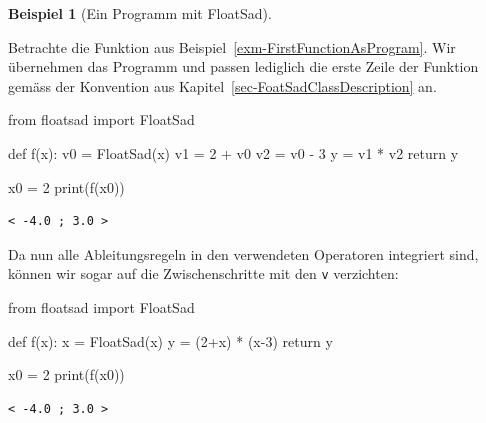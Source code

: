 \documentclass[
  a4paper,
  DIV=11]{scrreprt}
\newenvironment{Shaded}{\begin{snugshade}}{\end{snugshade}}
\newcommand{\BuiltInTok}[1]{\textcolor[rgb]{0.00,0.23,0.31}{#1}}
\newcommand{\ControlFlowTok}[1]{\textcolor[rgb]{0.00,0.23,0.31}{#1}}
\newcommand{\DecValTok}[1]{\textcolor[rgb]{0.68,0.00,0.00}{#1}}
\newcommand{\ImportTok}[1]{\textcolor[rgb]{0.00,0.46,0.62}{#1}}
\newcommand{\KeywordTok}[1]{\textcolor[rgb]{0.00,0.23,0.31}{#1}}
\newcommand{\NormalTok}[1]{\textcolor[rgb]{0.00,0.23,0.31}{#1}}
\newcommand{\OperatorTok}[1]{\textcolor[rgb]{0.37,0.37,0.37}{#1}}
\theoremstyle{definition}
\theoremstyle{definition}
\newtheorem{example}{Beispiel}[chapter]
\theoremstyle{remark}
\begin{document}
\begin{example}[Ein Programm mit
FloatSad]\protect\hypertarget{exm-FloatSadUsage1}{}\label{exm-FloatSadUsage1}

Betrachte die Funktion aus Beispiel~\ref{exm-FirstFunctionAsProgram}.
Wir übernehmen das Programm und passen lediglich die erste Zeile der
Funktion gemäss der Konvention aus
Kapitel~\ref{sec-FoatSadClassDescription} an.

\begin{Shaded}
\begin{Highlighting}[]
\ImportTok{from}\NormalTok{ floatsad }\ImportTok{import}\NormalTok{ FloatSad}

\KeywordTok{def}\NormalTok{ f(x):}
\NormalTok{    v0 }\OperatorTok{=}\NormalTok{ FloatSad(x)}
\NormalTok{    v1 }\OperatorTok{=} \DecValTok{2} \OperatorTok{+}\NormalTok{ v0}
\NormalTok{    v2 }\OperatorTok{=}\NormalTok{ v0 }\OperatorTok{{-}} \DecValTok{3}
\NormalTok{    y }\OperatorTok{=}\NormalTok{ v1 }\OperatorTok{*}\NormalTok{ v2}
    \ControlFlowTok{return}\NormalTok{ y}

\NormalTok{x0 }\OperatorTok{=} \DecValTok{2}
\BuiltInTok{print}\NormalTok{(f(x0))}
\end{Highlighting}
\end{Shaded}

\begin{verbatim}
< -4.0 ; 3.0 >
\end{verbatim}

Da nun alle Ableitungsregeln in den verwendeten Operatoren integriert
sind, können wir sogar auf die Zwischenschritte mit den \texttt{v}
verzichten:

\begin{Shaded}
\begin{Highlighting}[]
\ImportTok{from}\NormalTok{ floatsad }\ImportTok{import}\NormalTok{ FloatSad}

\KeywordTok{def}\NormalTok{ f(x):}
\NormalTok{    x }\OperatorTok{=}\NormalTok{ FloatSad(x)}
\NormalTok{    y }\OperatorTok{=}\NormalTok{ (}\DecValTok{2}\OperatorTok{+}\NormalTok{x) }\OperatorTok{*}\NormalTok{ (x}\OperatorTok{{-}}\DecValTok{3}\NormalTok{)}
    \ControlFlowTok{return}\NormalTok{ y}

\NormalTok{x0 }\OperatorTok{=} \DecValTok{2}
\BuiltInTok{print}\NormalTok{(f(x0))}
\end{Highlighting}
\end{Shaded}

\begin{verbatim}
< -4.0 ; 3.0 >
\end{verbatim}

\end{example}
\end{document}
